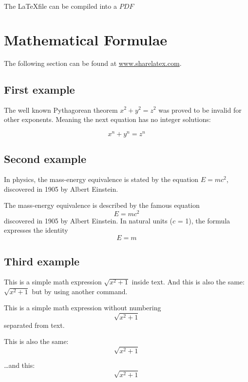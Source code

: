 \documentclass[tog]{acmsiggraph}
\begin{document}
The \LaTeX file can be compiled into a $PDF$

\section{Mathematical Formulae}
The following section can be found at \url{www.sharelatex.com}.
\subsection{First example}

The well known Pythagorean theorem \(x^2 + y^2 = z^2\) was 
proved to be invalid for other exponents. 
Meaning the next equation has no integer solutions:

\[ x^n + y^n = z^n \]



\subsection{Second example}

In physics, the mass-energy equivalence is stated by the equation $E=mc^2$, discovered in 1905 by Albert Einstein.

The mass-energy equivalence is described by the famous equation
$$E=mc^2$$
discovered in 1905 by Albert Einstein. 
In natural units ($c$ = 1), the formula expresses the identity
\begin{equation}
E=m
\end{equation}

\subsection{Third example}

This is a simple math expression \(\sqrt{x^2+1}\) inside text. 
And this is also the same: 
\begin{math}
	\sqrt{x^2+1}
\end{math}
but by using another command.

This is a simple math expression without numbering
\[\sqrt{x^2+1}\] 
separated from text.

This is also the same:
\begin{displaymath}
\sqrt{x^2+1}
\end{displaymath}

\ldots and this:
\begin{equation*}
	\sqrt{x^2+1}
\end{equation*}
\end{document}
